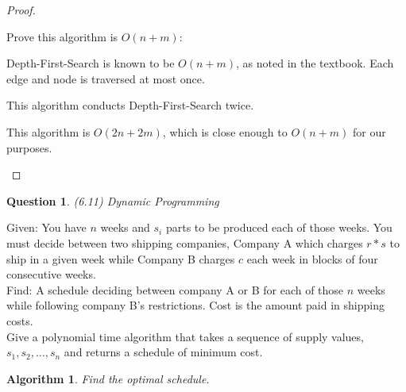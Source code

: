 \documentclass[11pt, oneside]{article}   	%
\newtheorem{Question}{Question}
\newtheorem{Algorithm}{Algorithm}
\begin{document}
\begin{proof}
\begin{description}
Prove this algorithm is $O(n+m)$:

 Depth-First-Search is known to be $O(n+m)$, as noted in the textbook. Each edge and node is traversed at most once.

This algorithm conducts Depth-First-Search twice.

This algorithm is $O(2n+2m)$, which is close enough to $O(n+m)$ for our purposes.

\end{description}
\end{proof}

\newpage

\begin{Question} (6.11) Dynamic Programming
\end{Question}
\noindent Given: You have $n$ weeks and $s_i$ parts to be produced each of those weeks. You must decide between two shipping companies, Company A which charges $r * s$ to ship in a given week while Company B charges $c$ each week in blocks of four consecutive weeks.\\

\noindent Find: A schedule deciding between company A or B for each of those $n$ weeks while following company B's restrictions. Cost is the amount paid in shipping costs. \\

\noindent Give a polynomial time algorithm that takes a sequence of supply values, $s_1, s_2, \ldots , s_n$ and returns a schedule of minimum cost.

\begin{Algorithm}
Find the optimal schedule.
\end{Algorithm}
\end{document}

